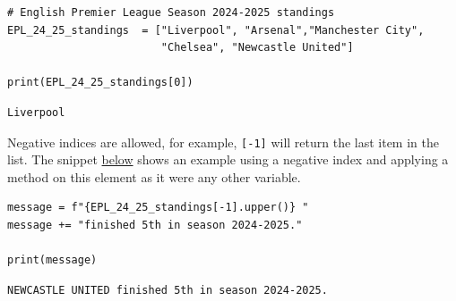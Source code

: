 \documentclass[10pt]{book}
\begin{document}
\label{orgc30a3f7}
\begin{verbatim}
# English Premier League Season 2024-2025 standings
EPL_24_25_standings  = ["Liverpool", "Arsenal","Manchester City",
                        "Chelsea", "Newcastle United"]

print(EPL_24_25_standings[0])
\end{verbatim}

\label{orgdbace0c}
\begin{verbatim}
Liverpool
\end{verbatim}

Negative indices are allowed, for example, \texttt{[-1]} will return the last item in the list. The snippet \hyperref[orgc4f0a16]{below} shows an example using a negative index and applying a method on this element as it were any other variable.

\label{orgc4f0a16}
\begin{verbatim}
message = f"{EPL_24_25_standings[-1].upper()} "
message += "finished 5th in season 2024-2025."

print(message)
\end{verbatim}

\label{orgfff6f49}
\begin{verbatim}
NEWCASTLE UNITED finished 5th in season 2024-2025.
\end{verbatim}
\end{document}
